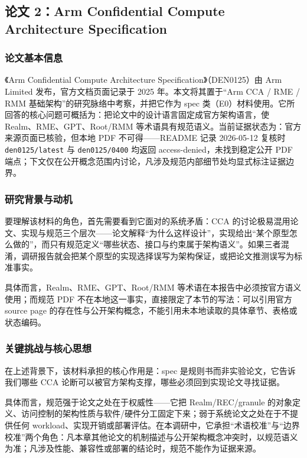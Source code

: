 \documentclass[11pt]{ctexart}
\begin{document}
\subsection{论文 2：Arm Confidential Compute Architecture Specification}
\subsubsection{论文基本信息}
《Arm Confidential Compute Architecture Specification》（DEN0125）由 Arm Limited 发布，官方文档页面记录于 2025 年。本文将其置于“Arm CCA / RME / RMM 基础架构”的研究脉络中考察，并把它作为 spec 类（E0）材料使用。它所回答的核心问题可概括为：把论文中的设计语言固定成官方架构语言，使 Realm、RME、GPT、Root/RMM 等术语具有规范语义。当前证据状态为：官方来源页面已核验，但本地 PDF 不可得——README 记录 2026-05-12 复核时 \texttt{den0125/latest} 与 \texttt{den0125/0400} 均返回 access-denied，未找到稳定公开 PDF 端点；下文仅在公开概念范围内讨论，凡涉及规范内部细节处均显式标注证据边界。\cite{arm_cca_spec}\par
\subsubsection{研究背景与动机}
要理解该材料的角色，首先需要看到它面对的系统矛盾：CCA 的讨论极易混用论文、实现与规范三个层次——论文解释“为什么这样设计”，实现给出“某个原型怎么做的”，而只有规范定义“哪些状态、接口与约束属于架构语义”。如果三者混淆，调研报告就会把某个原型的实现选择误写为架构保证，或把论文推测误写为标准事实。\par
具体而言，Realm、RME、GPT、Root/RMM 等术语在本报告中必须按官方语义使用；而规范 PDF 不在本地这一事实，直接限定了本节的写法：可以引用官方 source page 的存在性与公开架构概念，不能引用未本地读取的具体章节、表格或状态编码。\par
\subsubsection{关键挑战与核心思想}
在上述背景下，该材料承担的核心作用是：spec 是规则书而非实验论文，它告诉我们哪些 CCA 论断可以被官方架构支撑，哪些必须回到实现论文寻找证据。\par
具体而言，规范强于论文之处在于权威性——它把 Realm/REC/granule 的对象定义、访问控制的架构性质与软件/硬件分工固定下来；弱于系统论文之处在于不提供任何 workload、实现开销或部署评估。在本调研中，它承担“术语校准”与“边界校准”两个角色：凡本章其他论文的机制描述与公开架构概念冲突时，以规范语义为准；凡涉及性能、兼容性或部署的结论时，规范不能作为证据来源。\par
\end{document}
